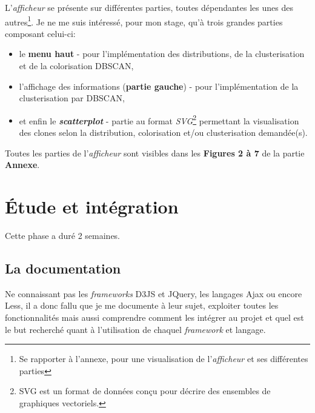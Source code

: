 \documentclass[12pt]{report}
\begin{document}
\begin{spacing}{1.2}
L'\textit{afficheur} se présente sur différentes parties, toutes dépendantes les unes des autres\footnote{Se rapporter à l'annexe, pour une visualisation de l'\textit{afficheur} et ses différentes parties}.
\newline Je ne me suis intéressé, pour mon stage, qu'à trois grandes parties composant celui-ci:
\begin{itemize}
\item{le \textbf{menu haut} - pour l'implémentation des distributions, de la clusterisation et de la colorisation DBSCAN,}
\item{l'affichage des informations (\textbf{partie gauche}) - pour l'implémentation de la clusterisation par DBSCAN,}
\item{et enfin le \textbf{\textit{scatterplot}} - partie au format \textit{SVG}\footnote{SVG est un format de données conçu pour décrire des ensembles de graphiques vectoriels.} permettant la visualisation des clones selon la distribution, colorisation et/ou clusterisation demandée(s).}
\end{itemize}
Toutes les parties de l'\textit{afficheur} sont visibles dans les \textbf{Figures 2 à 7} de la partie \textbf{Annexe}.

\section{Étude et intégration}

Cette phase a duré 2 semaines.

\subsection{La documentation}
Ne connaissant pas les \textit{frameworks} D3JS et JQuery, les langages Ajax ou encore Less, il a donc fallu que je me documente à leur sujet, exploiter toutes les fonctionnalités mais aussi comprendre comment les intégrer au projet et quel est le but recherché quant à l'utilisation de chaquel \textit{framework} et langage.


\end{spacing}
\end{document}
